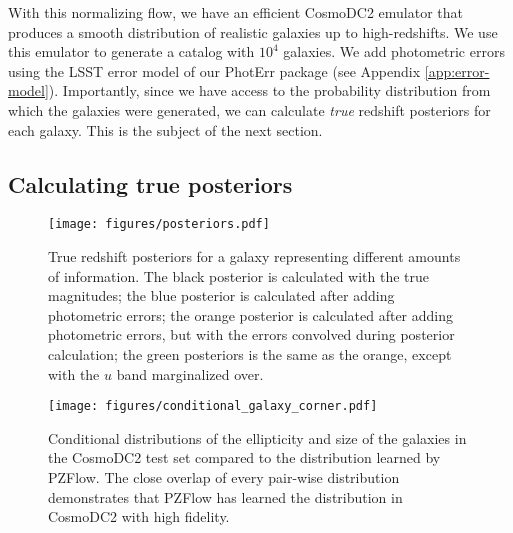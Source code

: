 \documentclass[twocolumn,twocolappendix,linenumbers]{aastex631}
\begin{document}
With this normalizing flow, we have an efficient CosmoDC2 emulator that produces a smooth distribution of realistic galaxies up to high-redshifts.
We use this emulator to generate a catalog with $10^4$ galaxies.
We add photometric errors using the LSST error model of our PhotErr package (see Appendix \ref{app:error-model}).
Importantly, since we have access to the probability distribution from which the galaxies were generated, we can calculate \emph{true} redshift posteriors for each galaxy.
This is the subject of the next section.

\subsection{Calculating true posteriors}
\label{sec:true-posteriors}

\begin{figure}[t]
    \begin{centering}
        \texttt{[image: figures/posteriors.pdf]}
        \caption{
            True redshift posteriors for a galaxy representing different amounts of information.
            The black posterior is calculated with the true magnitudes;
            the blue posterior is calculated after adding photometric errors;
            the orange posterior is calculated after adding photometric errors, but with the errors convolved during posterior calculation;
            the green posteriors is the same as the orange, except with the $u$ band marginalized over.
        }
        \label{fig:posteriors}
    \end{centering}
\end{figure}

\begin{figure*}[t]
    \begin{centering}
        \texttt{[image: figures/conditional\_galaxy\_corner.pdf]}
        \caption{
            Conditional distributions of the ellipticity and size of the galaxies in the CosmoDC2 test set compared to the distribution learned by PZFlow.
            The close overlap of every pair-wise distribution demonstrates that PZFlow has learned the distribution in CosmoDC2 with high fidelity.
        }
        \label{fig:conditional-corner}
    \end{centering}
\end{figure*}
\end{document}
